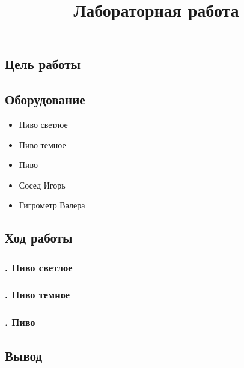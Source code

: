 \documentclass[a4paper, 12pt]{article}
\title{
  Лабораторная работа \textnumero \\
  \textbf{\textquote{\unskip}}
}
\author{}
\date{}
\begin{document}
\maketitle\thispagestyle{fancy}

\subsection*{Цель работы}
\lipsum[1-1]

\subsection*{Оборудование}
\begin{itemize}[noitemsep]
  \item Пиво светлое
  \item Пиво темное
  \item Пиво 
  \item Сосед Игорь
  \item Гигрометр Валера
\end{itemize}

\subsection*{{Ход работы}}

\subsubsection*{. Пиво светлое}
\lipsum[2-2]

\subsubsection*{. Пиво темное}
\lipsum[3-5]

\subsubsection*{. Пиво }
\lipsum[6-6]

\subsection*{{Вывод}}
\lipsum[7-7]
\end{document}
